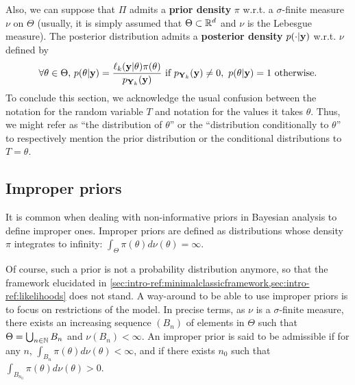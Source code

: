 Also, we can suppose that $\varPi$ admits a \textbf{prior density} $\pi$ w.r.t. a $\sigma$-finite measure $\nu$ on $\Theta$ (usually, it is simply assumed that $\Theta\subset\mathbb{R}^d$ and $\nu$ is the Lebesgue measure). 
The posterior distribution admits a \textbf{posterior density} $p(\cdot|\mathbf{y})$ w.r.t. $\nu$ defined by
    \begin{equation}
        \forall\theta\in\Theta,\, p(\theta|\mathbf{y}) = \frac{\ell_k(\mathbf{y}|\theta)\pi(\theta)}{p_{\mathbf{Y}_k}(\mathbf{y})}\text{\ if\ } p_{\mathbf{Y}_k}(\mathbf{y})\ne0,\ p(\theta|\mathbf{y})=1 \text{\ otherwise}.
    \end{equation}
To conclude this section, we acknowledge the usual confusion between the notation for the random variable $T$ and notation for the values it takes $\theta$. Thus, we might refer as ``the distribution of $\theta$'' or the ``distribution conditionally to $\theta$'' to respectively mention the prior distribution or the conditional distributions to $T=\theta$.


\subsection{Improper priors}\label{sec:intro-ref:improperway-around}

It is common when dealing with non-informative priors in Bayesian analysis to define improper ones.
Improper priors are defined as distributions whose density $\pi$ integrates to infinity: $\int_\Theta\pi(\theta)d\nu(\theta)=\infty$. 

Of course, such a prior is not a probability distribution anymore, so that the framework elucidated in \cref{sec:intro-ref:minimalclassicframework,sec:intro-ref:likelihoods} does not stand. 
A way-around to be able to use improper priors is to focus on restrictions of the model. In precise terms,  as $\nu$ is a $\sigma$-finite measure, there exists an increasing sequence $(B_n)$ of elements in $\Theta$ such that 
$\Theta=\bigcup_{n\in\mathbb{N}}B_n$ and $\nu(B_n) <\infty$.
An improper prior is said to be admissible if for any $n$, $\int_{B_n}\pi(\theta)d\nu(\theta)<\infty$, and if there exists $n_0$ such that $\int_{B_{n_0}}\pi(\theta)d\nu(\theta)>0$.

